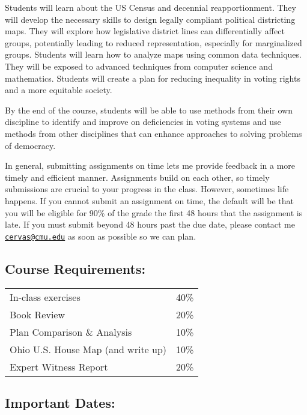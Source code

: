 \documentclass[
]{article}
\begin{document}
Students will learn about the US Census and decennial reapportionment.
They will develop the necessary skills to design legally compliant
political districting maps. They will explore how legislative district
lines can differentially affect groups, potentially leading to reduced
representation, especially for marginalized groups. Students will learn
how to analyze maps using common data techniques. They will be exposed
to advanced techniques from computer science and mathematics. Students
will create a plan for reducing inequality in voting rights and a more
equitable society.

By the end of the course, students will be able to use methods from
their own discipline to identify and improve on deficiencies in voting
systems and use methods from other disciplines that can enhance
approaches to solving problems of democracy.

In general, submitting assignments on time lets me provide feedback in a
more timely and efficient manner. Assignments build on each other, so
timely submissions are crucial to your progress in the class. However,
sometimes life happens. If you cannot submit an assignment on time, the
default will be that you will be eligible for 90\% of the grade the
first 48 hours that the assignment is late. If you must submit beyond 48
hours past the due date, please contact me
\href{mailto:cervas@cmu.edu}{\nolinkurl{cervas@cmu.edu}} as soon as
possible so we can plan.

\hypertarget{course-requirements}{%
\subsection{Course Requirements:}\label{course-requirements}}

\begin{longtable}[]{@{}ll@{}}
\toprule\noalign{}
\endhead
\bottomrule\noalign{}
\endlastfoot
In-class exercises & 40\% \\
Book Review & 20\% \\
Plan Comparison \& Analysis & 10\% \\
Ohio U.S. House Map (and write up) & 10\% \\
Expert Witness Report & 20\% \\
\end{longtable}

\hypertarget{important-dates}{%
\subsection{Important Dates:}\label{important-dates}}
\end{document}
